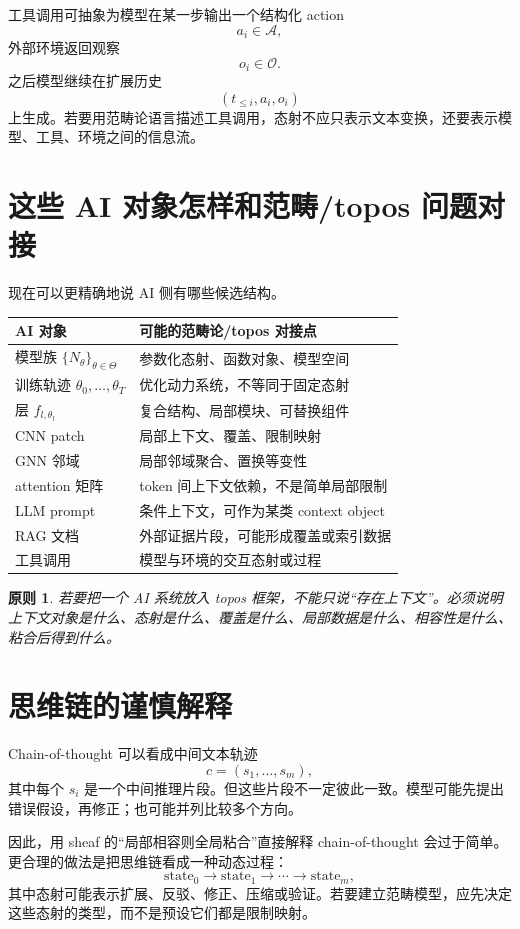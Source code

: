 \documentclass[UTF8,11pt,fontset=none]{ctexart}
\newtheorem{principle}[definition]{原则}
\newcommand{\ThetaSet}{\Theta}
\begin{document}
工具调用可抽象为模型在某一步输出一个结构化 action
\[
a_i\in\mathcal A,
\]
外部环境返回观察
\[
o_i\in\mathcal O.
\]
之后模型继续在扩展历史
\[
(t_{\le i},a_i,o_i)
\]
上生成。若要用范畴论语言描述工具调用，态射不应只表示文本变换，还要表示模型、工具、环境之间的信息流。

\section{这些 AI 对象怎样和范畴/topos 问题对接}

现在可以更精确地说 AI 侧有哪些候选结构。

\begin{longtable}{p{}p{}}
\toprule
AI 对象 & 可能的范畴论/topos 对接点 \\
\midrule
模型族 \(\{N_\theta\}_{\theta\in\ThetaSet}\) & 参数化态射、函数对象、模型空间 \\
训练轨迹 \(\theta_0,\ldots,\theta_T\) & 优化动力系统，不等同于固定态射 \\
层 \(f_{l,\theta_l}\) & 复合结构、局部模块、可替换组件 \\
CNN patch & 局部上下文、覆盖、限制映射 \\
GNN 邻域 & 局部邻域聚合、置换等变性 \\
attention 矩阵 & token 间上下文依赖，不是简单局部限制 \\
LLM prompt & 条件上下文，可作为某类 context object \\
RAG 文档 & 外部证据片段，可能形成覆盖或索引数据 \\
工具调用 & 模型与环境的交互态射或过程 \\
\bottomrule
\end{longtable}

\begin{principle}
若要把一个 AI 系统放入 topos 框架，不能只说“存在上下文”。必须说明上下文对象是什么、态射是什么、覆盖是什么、局部数据是什么、相容性是什么、粘合后得到什么。
\end{principle}

\section{思维链的谨慎解释}

Chain-of-thought 可以看成中间文本轨迹
\[
c=(s_1,\ldots,s_m),
\]
其中每个 \(s_i\) 是一个中间推理片段。但这些片段不一定彼此一致。模型可能先提出错误假设，再修正；也可能并列比较多个方向。

因此，用 sheaf 的“局部相容则全局粘合”直接解释 chain-of-thought 会过于简单。更合理的做法是把思维链看成一种动态过程：
\[
\text{state}_0\to \text{state}_1\to\cdots\to \text{state}_m,
\]
其中态射可能表示扩展、反驳、修正、压缩或验证。若要建立范畴模型，应先决定这些态射的类型，而不是预设它们都是限制映射。
\end{document}
